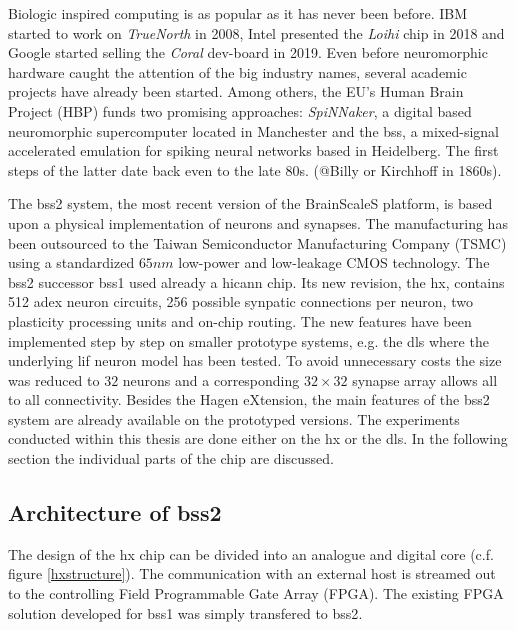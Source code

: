 Biologic inspired computing is as popular as it has never been before. IBM started to work on \textit{TrueNorth} in 2008, Intel presented the \textit{Loihi} chip in 2018 and Google started selling the \textit{Coral} dev-board in 2019. Even before neuromorphic hardware caught the attention of the big industry names, several academic projects have already been started. Among others, the EU's Human Brain Project (HBP) funds two promising approaches: \textit{SpiNNaker}, a digital based neuromorphic supercomputer located in Manchester and the \gls{bss}, a mixed-signal accelerated emulation for spiking neural networks based in Heidelberg. The first steps of the latter date back even to the late 80s. (@Billy or Kirchhoff in 1860s).

The \gls{bss2} system, the most recent version of the BrainScaleS platform, is based upon a physical implementation of neurons and synapses. The manufacturing has been outsourced to the Taiwan Semiconductor Manufacturing Company (TSMC) using a standardized $65 \si{nm}$ low-power and low-leakage CMOS technology. The \gls{bss2} successor \gls{bss1} used already a \gls{hicann} chip. Its new revision, the \gls{hx}, contains 512 \gls{adex} neuron circuits, 256 possible synpatic connections per neuron, two plasticity processing units and on-chip routing. The new features have been implemented step by step on smaller prototype systems, e.g. the \gls{dls} where the underlying \gls{lif} neuron model has been tested. To avoid unnecessary costs the size was reduced to $32$ neurons and a corresponding $32 \times 32$ synapse array allows all to all connectivity. Besides the Hagen eXtension, the main features of the \gls{bss2} system are already available on the prototyped versions.  The experiments conducted within this thesis are done either on the \gls{hx} or the \gls{dls}. In the following section the individual parts of the chip are discussed.




\subsection{Architecture of \gls{bss2}}

The design of the \gls{hx} chip can be divided into an analogue and digital core (c.f. figure \ref{hxstructure}). The communication with an external host is streamed out to the controlling Field Programmable Gate Array (FPGA). The existing FPGA solution developed for \gls{bss1} was simply transfered to \gls{bss2}.

